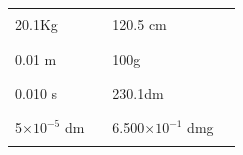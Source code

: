 \documentclass[main.tex]{subfiles}
\begin{document}
\begin{enumerate}
\begin{tabular}{ p{3cm} p{3cm} p{3cm}p{3cm}   }
  20.1Kg 				&\rule{3cm}{0.4pt}&			120.5 cm&\rule{3cm}{0.4pt}  \\[0.1cm]      
  0.01 m 				&\rule{3cm}{0.4pt}&			100g&\rule{3cm}{0.4pt}  \\[0.1cm]      
  0.010 s 				&\rule{3cm}{0.4pt}&			230.1dm&\rule{3cm}{0.4pt}  \\[0.1cm]      
  5$\times 10^{-5}$ dm 				&\rule{3cm}{0.4pt}&			6.500$\times 10^{-1}$ dmg&\rule{3cm}{0.4pt}  \\[0.1cm]      

 \end{tabular}

\vspace{2.5cm}

\end{enumerate}



 
\end{document}
